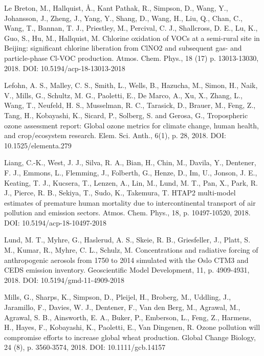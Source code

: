 \begin{list}{}{\setlength{\leftmargin}{15pt}\setlength{\itemindent}{-\leftmargin}}
\item[]
Le Breton, M., Hallquist, {\AA}., Kant Pathak, R., Simpson, D., Wang, Y., Johansson, J., Zheng, J., Yang, Y., Shang, D., Wang, H., Liu, Q., Chan, C., Wang, T., Bannan, T. J., Priestley, M., Percival, C. J., Shallcross, D. E., Lu, K., Guo, S., Hu, M., Hallquist, M. 
Chlorine oxidation of VOCs at a semi-rural site in Beijing: significant chlorine liberation from ClNO2 and subsequent gas- and particle-phase Cl-VOC production.  Atmos. Chem. Phys., 18 (17) p. 13013-13030, 2018. 
DOI: 10.5194/acp-18-13013-2018

\item[]
Lefohn, A. S., Malley, C. S., Smith, L., Wells, B., Hazucha, M., Simon, H., Naik, V., Mills, G., Schultz, M. G., Paoletti, E., De Marco, A., Xu, X., Zhang, L., Wang, T., Neufeld, H. S., Musselman, R. C., Tarasick, D., Brauer, M., Feng, Z., Tang, H., Kobayashi, K., Sicard, P., Solberg, S. and Gerosa, G., 
Tropospheric ozone assessment report: Global ozone metrics for climate change, human health, and crop/ecosystem research. 
Elem. Sci. Anth., 6(1), p. 28, 2018.
DOI: 10.1525/elementa.279

\item[]
Liang, C.-K., West, J. J., Silva, R. A., Bian, H., Chin, M., Davila, Y., Dentener, F. J., Emmons, L., Flemming, J., Folberth, G., Henze, D., Im, U., Jonson, J. E., Keating, T. J., Kucsera, T., Lenzen, A., Lin, M., Lund, M. T., Pan, X., Park, R. J., Pierce, R. B., Sekiya, T., Sudo, K., Takemura, T. 
HTAP2 multi-model estimates of premature human mortality due to intercontinental transport of air pollution and emission sectors. 
Atmos. Chem. Phys., 18, p. 10497-10520, 2018. DOI: 10.5194/acp-18-10497-2018

\item[]
Lund, M. T., Myhre, G., Haslerud, A. S., Skeie, R. B., Griesfeller, J., Platt, S. M., Kumar, R., Myhre, C. L., Schulz, M. 
Concentrations and radiative forcing of anthropogenic aerosols from 1750 to 2014 simulated with the Oslo CTM3 and CEDS emission inventory. 
Geoscientific Model Development, 11, p. 4909-4931, 2018. 
DOI: 10.5194/gmd-11-4909-2018

\item[]
Mills, G., Sharps, K., Simpson, D., Pleijel, H., Broberg, M., Uddling, J., Jaramillo, F., Davies, W. J., Dentener, F., Van den Berg, M., Agrawal, M., Agrawal, S. B., Ainsworth, E. A., Buker, P., Emberson, L., Feng, Z., Harmens, H., Hayes, F., Kobayashi, K., Paoletti, E., Van Dingenen, R. 
Ozone pollution will compromise efforts to increase global wheat production. 
Global Change Biology, 24 (8), p. 3560-3574, 2018. 
DOI: 10.1111/gcb.14157


\end{list}
